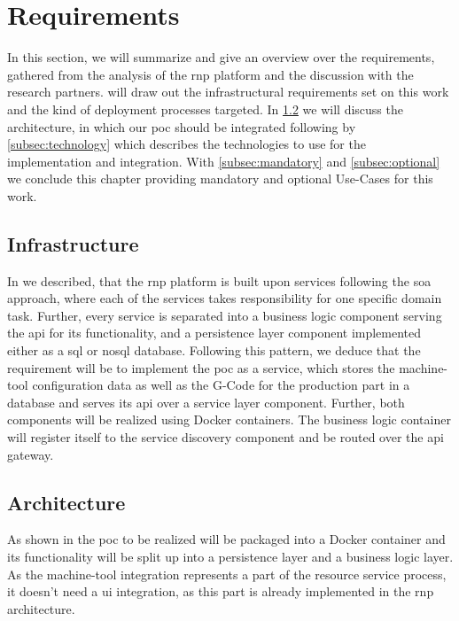 \documentclass[
a4paper,
twoside,
headsepline,
cleardoublepage=empty,
parskip=half,
draft=false
]{scrbook}
\begin{document}
		\section{Requirements} \label{sec:requirements}

			In this section, we will summarize and give an overview over the requirements, gathered from the analysis of the \gls{rnp} platform and the discussion with the research partners.
			 will draw out the infrastructural requirements set on this work and the kind of deployment processes targeted.
			In \cref{subsec:architecture} we will discuss the architecture, in which our \gls{poc} should be integrated following by \cref{subsec:technology} which describes the technologies to use for the implementation and integration.
			With \cref{subsec:mandatory} and \cref{subsec:optional} we conclude this chapter providing mandatory and optional Use-Cases for this work.

			\subsection{Infrastructure} \label{subsec:infrastructure}

				In  we described, that the \gls{rnp} platform is built upon services following the \gls{soa} approach, where each of the services takes responsibility for one specific domain task.
				Further, every service is separated into a business logic component serving the \gls{api} for its functionality, and a persistence layer component implemented either as a \gls{sql} or \gls{nosql} database.
				Following this pattern, we deduce that the requirement will be to implement the \gls{poc} as a service, which stores the machine-tool configuration data as well as the G-Code for the production part in a database and serves its \gls{api} over a service layer component.
				Further, both components will be realized using Docker containers.
				The business logic container will register itself to the service discovery component and be routed over the \gls{api} gateway.

			\subsection{Architecture} \label{subsec:architecture}

				As shown in  the \gls{poc} to be realized will be packaged into a Docker container and its functionality will be split up into a persistence layer and a business logic layer.
				As the machine-tool integration represents a part of the resource service process, it doesn't need a \gls{ui} integration, as this part is already implemented in the \gls{rnp} architecture.
\end{document}
